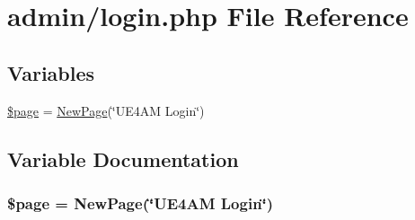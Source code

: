 \hypertarget{login_8php}{\section{admin/login.php File Reference}
\label{login_8php}
}
\subsection*{Variables}
\begin{DoxyCompactItemize}
\item 
\hyperlink{login_8php_a0a44e6760141442bb439b1ab1395d8ff}{\$page} = \hyperlink{ui_8php_a16321ea290dabb36fceb18b44b356f81}{New\-Page}(\char`\"{}U\-E4\-A\-M Login\char`\"{})
\end{DoxyCompactItemize}


\subsection{Variable Documentation}
\hypertarget{login_8php_a0a44e6760141442bb439b1ab1395d8ff}{
\subsubsection[{\$page}]{\setlength{\rightskip}{0pt plus 5cm}\$page = {\bf New\-Page}(\char`\"{}U\-E4\-A\-M Login\char`\"{})}}\label{login_8php_a0a44e6760141442bb439b1ab1395d8ff}
